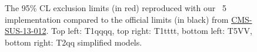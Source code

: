 \begin{figure}
\caption{The 95\% CL exclusion limits (in red) reproduced with our {}~5 implementation compared to the official limits (in black) from \href{https://twiki.cern.ch/twiki/bin/view/CMSPublic/PhysicsResultsSUS13012}{CMS-SUS-13-012}. Top left: T1qqqq, top right: T1tttt, bottom left: T5VV, bottom right: T2qq simplified models.
\label{fig:limitplots}}
        \end{figure} 
\FloatBarrier